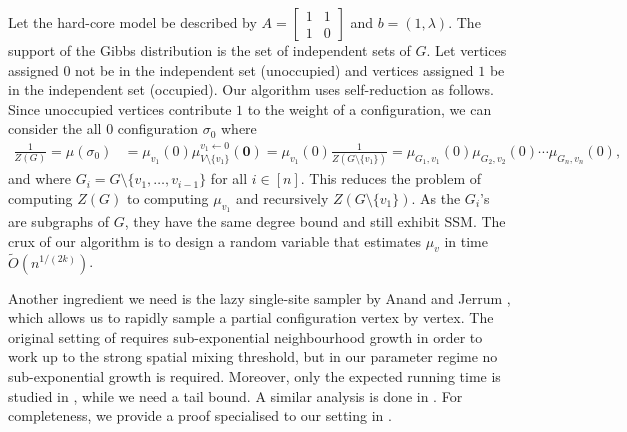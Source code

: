 \documentclass[11pt]{amsart}
\theoremstyle{definition}
\theoremstyle{remark}
\begin{document}
Let the hard-core model be described by $A=\begin{bmatrix}1&1\\1&0\end{bmatrix}$ and $b=(1,\lambda)$.
The support of the Gibbs distribution is the set of independent sets of $G$. 
Let vertices assigned $0$ not be in the independent set (unoccupied) and vertices assigned $1$ be in the independent set (occupied). 
Our algorithm uses self-reduction \cite{JVV86} as follows.
Since unoccupied vertices contribute $1$ to the weight of a configuration, we can consider the all $0$ configuration $\sigma_0$ where 
\begin{align}
\label{hardcore-reduction}
\frac{1}{Z(G)}=\mu(\sigma_0)&=\mu_{v_1}(0)\mu_{V\setminus\{v_1\}}^{v_1\leftarrow0}(\mathbf{0})
=\mu_{v_1}(0)\frac{1}{Z(G\setminus\{v_1\})}
=\mu_{G_1,v_1}(0)\mu_{G_2,v_2}(0)\cdots\mu_{G_n,v_n}(0),
\end{align}
and where $G_i=G\setminus\{v_1,\ldots,v_{i-1}\}$ for all $i\in[n]$.
This reduces the problem of computing $Z(G)$ to computing $\mu_{v_1}$ and recursively $Z(G\setminus\{v_1\})$.
As the $G_i$'s are subgraphs of $G$, they have the same degree bound and still exhibit SSM.
The crux of our algorithm is to design a random variable that estimates $\mu_{v}$ in time $\widetilde{O}(n^{1/(2k)})$.



Another ingredient we need is the lazy single-site sampler by Anand and Jerrum \cite{AJ22},
which allows us to rapidly sample a partial configuration vertex by vertex. 
The original setting of \cite{AJ22} requires sub-exponential neighbourhood growth in order to work up to the strong spatial mixing threshold, but in our parameter regime no sub-exponential growth is required. 
Moreover, only the expected running time is studied in \cite{AJ22}, while we need a tail bound. 
A similar analysis is done in \cite[Appendix B]{FGWWY22}. 
For completeness, we provide a proof specialised to our setting in .
\end{document}
